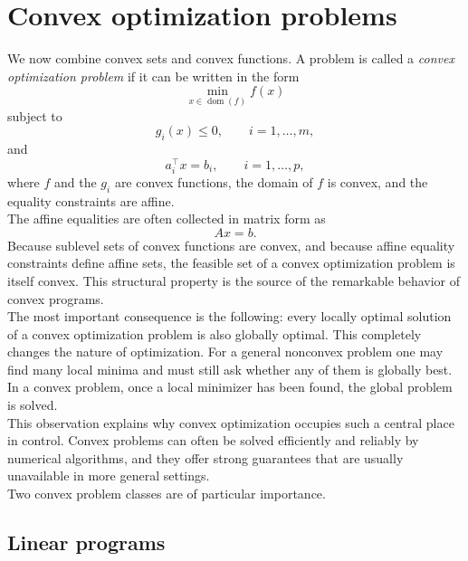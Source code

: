 \section{Convex optimization problems}

We now combine convex sets and convex functions. A problem is called a \emph{convex optimization problem} if it can be written in the form
\[
\min_{x\in\operatorname{dom}(f)} f(x)
\]
subject to
\[
g_i(x)\le 0,\qquad i=1,\dots,m,
\]
and
\[
a_i^\top x = b_i,\qquad i=1,\dots,p,
\]
where \(f\) and the \(g_i\) are convex functions, the domain of \(f\) is convex, and the equality constraints are affine.\\
The affine equalities are often collected in matrix form as
\[
Ax=b.
\]
Because sublevel sets of convex functions are convex, and because affine equality constraints define affine sets, the feasible set of a convex optimization problem is itself convex. This structural property is the source of the remarkable behavior of convex programs.\\

The most important consequence is the following: every locally optimal solution of a convex optimization problem is also globally optimal. This completely changes the nature of optimization. For a general nonconvex problem one may find many local minima and must still ask whether any of them is globally best. In a convex problem, once a local minimizer has been found, the global problem is solved.\\
This observation explains why convex optimization occupies such a central place in control. Convex problems can often be solved efficiently and reliably by numerical algorithms, and they offer strong guarantees that are usually unavailable in more general settings.\\

Two convex problem classes are of particular importance.

\subsection{Linear programs}

